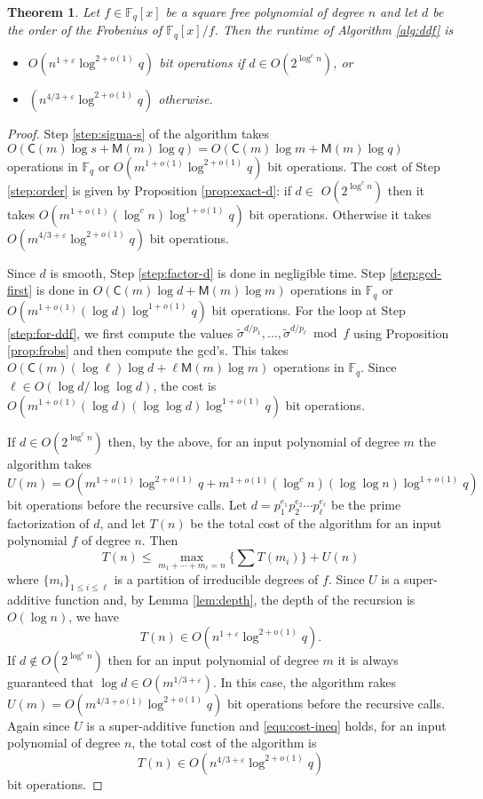\documentclass{article}
\theoremstyle{plain}
\newtheorem{theorem}{Theorem}
\theoremstyle{definition}
\def\F{\ensuremath{\mathbb{F}}}
\def\MM{\ensuremath{\mathsf{M}}}
\def\CC{\ensuremath{\mathsf{C}}}
\begin{document}
\begin{theorem}\label{theo:main}
	Let $f \in \F_q[x]$ be a square free polynomial of degree $n$ and let $d$ be the order of the 
	Frobenius of $\F_q[x] / f$. Then the runtime of Algorithm \ref{alg:ddf} is
	\begin{itemize}
		\item $O(n^{1 + \varepsilon} \log^{2 + o(1)}q)$ bit operations if $d \in O(2^{\log^cn})$, or
		\item $(n^{4 / 3 + \varepsilon} \log^{2 + o(1)}q)$ otherwise.
	\end{itemize}
\end{theorem}
\begin{proof}
	Step \ref{step:sigma-s} of the algorithm takes $O(\CC(m)\log s + \MM(m)\log q) = O(\CC(m)\log m 
	+ \MM(m)\log q)$ operations in $\F_q$ or $O(m^{1 + o(1)}\log^{2 + o(1)}q)$ bit operations. The 
	cost of Step \ref{step:order} is given by Proposition \ref{prop:exact-d}: if $d \in $ 
	$O(2^{\log^cn})$ then it takes $O(m^{1 + o(1)} (\log^cn) \log^{1 + o(1)}q)$ bit operations. 
	Otherwise it takes $O(m^{4 / 3 + \varepsilon} \log^{2 + o(1)}q)$ bit operations. 
	
	Since $d$ is smooth, Step \ref{step:factor-d} is done in negligible time. Step 
	\ref{step:gcd-first} is done in $O(\CC(m)\log d + \MM(m)\log m)$ operations in $\F_q$ or 
	$O(m^{1 + o(1)}(\log d)\log^{1 + o(1)}q)$ bit operations. For the loop at Step 
	\ref{step:for-ddf}, we first compute the values $\tilde{\sigma}^{d / p_1}, \dots, 
	\tilde{\sigma}^{d / p_\ell} \bmod f$ using Proposition \ref{prop:frobs} and then compute the 
	gcd's. This takes $O(\CC(m)(\log \ell)\log d + \ell\MM(m)\log m)$ operations in $\F_q$. Since 
	$\ell \in O(\log d / \log\log d)$, the cost is $O(m^{1 + o(1)}(\log d)(\log \log d)\log^{1 + 
	o(1)}q)$ bit operations.
	
	If $d \in O(2^{\log^cn})$ then, by the above, for an input polynomial of degree $m$ the 
	algorithm takes 
	\[ U(m) = O(m^{1 + o(1)}\log^{2 + o(1)}q + m^{1 + o(1)}(\log^cn)(\log \log n)\log^{1 + o(1)}q) 
	\]
	bit operations before the recursive calls. Let $d = p_1^{e_1} p_2^{e_2} \cdots p_\ell^{e_\ell}$ 
	be the prime factorization of $d$, and let $T(n)$ be the total cost of the algorithm for an 
	input polynomial $f$ of degree $n$. Then
	\begin{equation}
	\label{equ:cost-ineq}
		T(n) \le \max_{m_1 + \cdots + m_\ell = n} \{ \sum T(m_i) \} + U(n)
	\end{equation}
	where $\{ m_i \}_{1 \le i \le \ell}$ is a partition of irreducible degrees of $f$. Since $U$ is 
	a super-additive function and, by Lemma \ref{lem:depth}, the depth of the recursion is $O(\log 
	n)$, we have
	\[ T(n) \in O(n^{1 + \varepsilon} \log^{2 + o(1)}q). \]
	If $d \notin O(2^{\log^cn})$ then for an input polynomial of degree $m$ it is always guaranteed 
	that $\log d \in O(m^{1 / 3 + \varepsilon})$. In this case, the algorithm rakes $U(m) = O(m^{4 / 3 + 
	o(1)} \log^{2 + o(1)}q)$ bit operations before the recursive calls. Again since $U$ is a 
	super-additive function and \eqref{equ:cost-ineq} holds, for an input polynomial of degree $n$, 
	the total cost of the algorithm is
	\[ T(n) \in O(n^{4 / 3 + \varepsilon} \log^{2 + o(1)}q) \]
	bit operations.
\end{proof}
\end{document}
